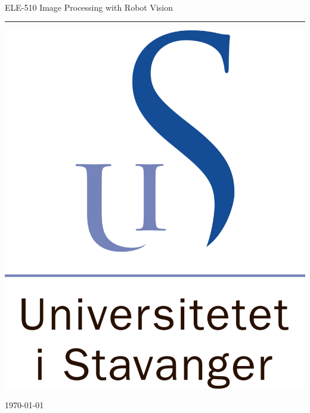 \begin{titlepage}

    \begin{center}
        
        ~\\[1.0cm]
        
        \Large ELE-510 Image Processing with Robot Vision\\[2.5cm]
         
        {\LARGE \textbf{\MakeUppercase{\mytitle}}}
        \vspace{0.5cm}
        \hrule
        
        \vspace{1.0cm}
        \large {\myauthor} 
        \vspace{4.0cm}
        
        \includegraphics[scale=0.1]{img/standard_uis.png}
        
        \vspace{0.5cm}
        
    	{\large \today\par}
        
    \end{center}

\end{titlepage}